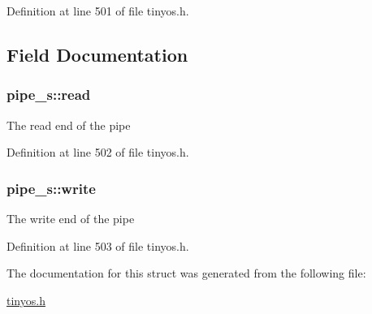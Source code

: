 Definition at line 501 of file tinyos.\-h.



\subsection{Field Documentation}
\hypertarget{structpipe__s_ad0839b4f9b1fdb0241411952203f18aa}{
\subsubsection[{read}]{ pipe\-\_\-s\-::read}}\label{structpipe__s_ad0839b4f9b1fdb0241411952203f18aa}
The read end of the pipe 

Definition at line 502 of file tinyos.\-h.

\hypertarget{structpipe__s_a69acc9cdf5f10195c43491e3ffa98cb1}{
\subsubsection[{write}]{ pipe\-\_\-s\-::write}}\label{structpipe__s_a69acc9cdf5f10195c43491e3ffa98cb1}
The write end of the pipe 

Definition at line 503 of file tinyos.\-h.



The documentation for this struct was generated from the following file\-:\begin{DoxyCompactItemize}
\item 
\hyperlink{tinyos_8h}{tinyos.\-h}\end{DoxyCompactItemize}
